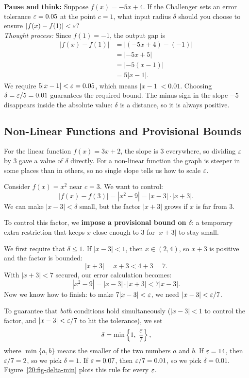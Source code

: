\begin{recoverybox}
\textbf{Pause and think:} Suppose $f(x) = -5x + 4$. If the Challenger sets an error tolerance $\varepsilon = 0.05$ at the point $c = 1$, what input radius $\delta$ should you choose to ensure $|f(x) - f(1)| < \varepsilon$?
\\[0.4em]
\emph{Thought process:} Since $f(1) = -1$, the output gap is
\begin{align*}
|f(x) - f(1)| &= |(-5x + 4) - (-1)|\\
&= \lvert -5x + 5 \rvert\\
&= \lvert -5(x - 1) \rvert\\
&= 5|x - 1|.
\end{align*}
We require $5|x - 1| < \varepsilon = 0.05$, which means $|x - 1| < 0.01$. Choosing $\delta = \varepsilon/5 = 0.01$ guarantees the required bound. The minus sign in the slope $-5$ disappears inside the absolute value: $\delta$ is a distance, so it is always positive.
\end{recoverybox}

\subsection{Non-Linear Functions and Provisional Bounds}

For the linear function $f(x) = 3x + 2$, the slope is $3$ everywhere, so dividing $\varepsilon$ by $3$ gave a value of $\delta$ directly. For a non-linear function the graph is steeper in some places than in others, so no single slope tells us how to scale $\varepsilon$.

Consider $f(x) = x^2$ near $c = 3$. We want to control:
\[
|f(x) - f(3)| = |x^2 - 9| = |x - 3| \cdot |x + 3|.
\]
We can make $|x - 3| < \delta$ small, but the factor $|x + 3|$ grows if $x$ is far from $3$.

To control this factor, we \textbf{impose a provisional bound on $\delta$}: a temporary extra restriction that keeps $x$ close enough to $3$ for $|x + 3|$ to stay small.

We first require that $\delta \le 1$. If $|x - 3| < 1$, then $x \in (2, 4)$, so $x + 3$ is positive and the factor is bounded:
\[
|x + 3| = x + 3 < 4 + 3 = 7.
\]
With $|x + 3| < 7$ secured, our error calculation becomes:
\[
|x^2 - 9| = |x - 3| \cdot |x + 3| < 7|x - 3|.
\]
Now we know how to finish: to make $7|x - 3| < \varepsilon$, we need $|x - 3| < \varepsilon / 7$.

To guarantee that \emph{both} conditions hold simultaneously ($|x - 3| < 1$ to control the factor, and $|x - 3| < \varepsilon/7$ to hit the tolerance), we set
\[
\delta = \min\left\{1, \; \frac{\varepsilon}{7}\right\},
\]
where $\min\{a, b\}$ means the smaller of the two numbers $a$ and $b$.
If $\varepsilon = 14$, then $\varepsilon/7 = 2$, so we pick $\delta = 1$. If $\varepsilon = 0.07$, then $\varepsilon/7 = 0.01$, so we pick $\delta = 0.01$. Figure~\ref{20:fig-delta-min} plots this rule for every $\varepsilon$.


